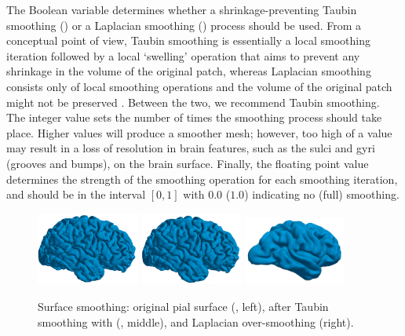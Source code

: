 The Boolean variable  determines
whether a shrinkage-preventing \cite{taubin1995curve} Taubin smoothing 
() or a Laplacian 
smoothing () process should be used.  From a conceptual
point of view, Taubin smoothing is essentially a local smoothing
iteration followed by a local `swelling' operation that aims to prevent 
any shrinkage in the volume of the original patch, whereas Laplacian smoothing 
consists only of local smoothing operations and the volume of the original
patch might not be preserved \cite{taubin1995curve}. Between the two, we
recommend Taubin smoothing. The integer value 
sets the number of times the smoothing process should take place. Higher
values will produce a smoother mesh; however, too high of a value may
result in a loss of resolution in brain features, such as the sulci and
gyri (grooves and bumps), on the brain surface. Finally, the floating
point value  determines the strength of the
smoothing operation for each smoothing iteration, and should be in the
interval $[0, 1]$ with $0.0$ ($1.0$) indicating no (full)
smoothing.
\begin{figure}
  \centering
  \includegraphics[width=0.30\textwidth]{./graphics/chp3/unsmoothed.png}
  \includegraphics[width=0.30\textwidth]{./graphics/chp3/taubin-smoothed-10.png}
  \includegraphics[width=0.30\textwidth]{./graphics/chp3/oversmoothing.png}
  \caption{Surface smoothing: original pial surface 
    (, left), after Taubin smoothing with
    {\svmtk} (, middle), and Laplacian over-smoothing (right).}
  \label{fig:chp3:ernie-smoothing}
\end{figure}
%

